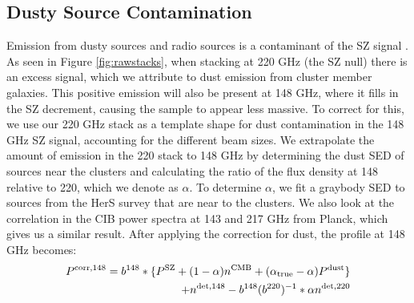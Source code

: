 \documentclass[a4paper,fleqn,usenatbib]{mnras}
\begin{document}
\subsection{Dusty Source Contamination}

Emission from dusty sources and radio sources is a contaminant of the SZ signal \citep{2005A&A...439..901A}. As seen in Figure \ref{fig:rawstacks}, when stacking at 220 GHz (the SZ null) there is an excess signal, which we attribute to dust emission from cluster member galaxies. This positive emission will also be present at 148 GHz, where it fills in the SZ decrement, causing the sample to appear less massive. To correct for this, we use our 220 GHz stack as a template shape for dust contamination in the 148 GHz SZ signal, accounting for the different beam sizes. We extrapolate the amount of emission in the 220 stack to 148 GHz by determining the dust SED of sources near the clusters and calculating the ratio of the flux density at 148 relative to 220, which we denote as $\alpha$. To determine $\alpha$, we fit a graybody SED to sources from the HerS survey that are near to the clusters. We also look at the correlation in the CIB power spectra at 143 and 217 GHz from Planck, which gives us a similar result. 
After applying the correction for dust, the profile at 148 GHz becomes:
\begin{equation}
\begin{split}
  P^{\rm corr,148} = b^{148} \ast \{ P^{\rm SZ} 
+ (1 - \alpha) n^{\rm CMB} + (\alpha_{\rm true} - \alpha) P^{\rm dust} \} 
\\+ n^{\rm det,148} - b^{148}( b^{220})^{-1} \ast \alpha n^{\rm det,220} 
  \end{split}
\end{equation}

\end{document}
